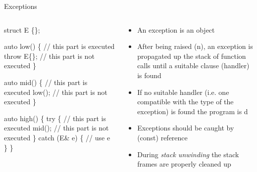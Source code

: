 \begin{frame}[fragile]{Exceptions \insertcontinuationtext}
  \begin{columns}

    \begin{column}{.5\textwidth}
      \begin{codeblock}
struct E \{\};

auto low() \{
  \ddd // this part is executed
  \alert{throw} E\{\};
  \ddd // this part is not executed
\}

auto mid() \{
  \ddd // this part is executed
  low();
  \ddd // this part is not executed
\}

auto high() \{
  \alert{try} \{
    \ddd // this part is executed
    mid();
    \ddd // this part is not executed
  \} \alert{catch} (E& e) \{
    \ddd // use e
  \}
\}\end{codeblock}
    \end{column}

    \begin{column}{.5\textwidth}
      \begin{itemize}[<+->]
      \item An exception is an object
      \item After being raised (n), an exception is propagated up the stack
        of function calls until a suitable  clause (handler) is
        found
      \item If no suitable handler (i.e. one compatible with the type of the
        exception) is found the program is d
      \item Exceptions should be caught by (const) reference
      \item During \textit{stack unwinding} the stack frames are properly
        cleaned up
      \end{itemize}
    \end{column}

  \end{columns}

\end{frame}


